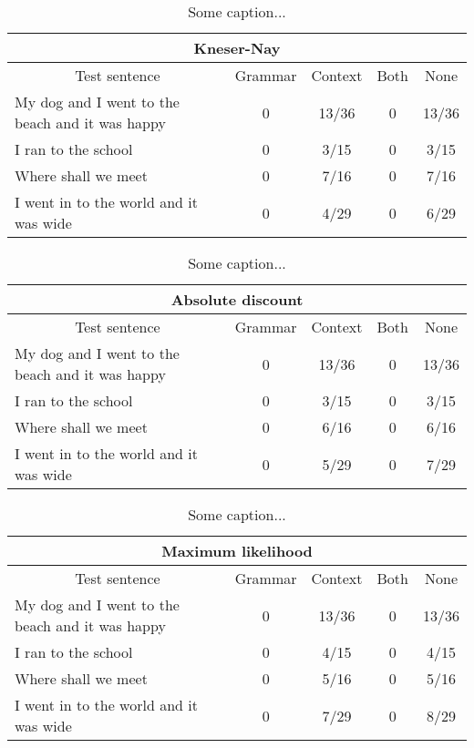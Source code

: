 {\begin{table}[H]
\centering
\caption{Some caption...}
\begin{tabular}{ |p{}|c|c|c|c| }
	\hline
	\multicolumn{5}{|c|}{Kneser-Nay} \\
	\hline
	\multicolumn{1}{|c|}{Test sentence} & Grammar & Context & Both & None \\
	\hline
	My dog and I went to the beach and it was happy & 0 & 13/36 & 0 & 13/36 \\
	\hline
	I ran to the school & 0 & 3/15 & 0 & 3/15 \\
	\hline
	Where shall we meet & 0 & 7/16 & 0 & 7/16 \\
	\hline
	I went in to the world and it was wide & 0 & 4/29 & 0 & 6/29 \\
	\hline
\end{tabular}
\end{table}

\vspace{-1cm}
\begin{table}[H]
\centering
\caption{Some caption...}
\begin{tabular}{ |p{}|c|c|c|c| }
	\hline
	\multicolumn{5}{|c|}{Absolute discount} \\
	\hline
	\multicolumn{1}{|c|}{Test sentence} & Grammar & Context & Both & None \\
	\hline
	My dog and I went to the beach and it was happy & 0 & 13/36 & 0 & 13/36 \\
	\hline
	I ran to the school & 0 & 3/15 & 0 & 3/15 \\
	\hline
	Where shall we meet & 0 & 6/16 & 0 & 6/16 \\
	\hline
	I went in to the world and it was wide & 0 & 5/29 & 0 & 7/29 \\
	\hline
\end{tabular}
\end{table}

\vspace{-1cm}
\begin{table}[H]
\centering
\caption{Some caption...}
\begin{tabular}{ |p{}|c|c|c|c| }
	\hline
	\multicolumn{5}{|c|}{Maximum likelihood} \\
	\hline
	\multicolumn{1}{|c|}{Test sentence} & Grammar & Context & Both & None \\
	\hline
	My dog and I went to the beach and it was happy & 0 & 13/36 & 0 &13/36 \\
	\hline
	I ran to the school & 0 & 4/15 & 0 & 4/15 \\
	\hline
	Where shall we meet & 0 & 5/16 & 0 & 5/16 \\
	\hline
	I went in to the world and it was wide & 0 & 7/29 & 0 & 8/29 \\
	\hline
\end{tabular}
\end{table}

}
